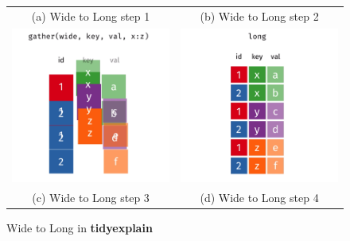 \begin{figure}[H]
\begin{tabular}{cc}
    (a) Wide to Long step 1 & (b) Wide to Long step 2 \\[6pt]
     \includegraphics[scale = 0.25]{Masters-Thesis/img/tidyew2ls3.png} & \includegraphics[scale = 0.25]{Masters-Thesis/img/tidyew2ls4.png} \\
    (c) Wide to Long step 3 & (d) Wide to Long step 4 \\[6pt]
    \end{tabular}
    \caption{Wide to Long in \textbf{tidyexplain}}
    \label{fig:tidyew2l}
\end{figure}


